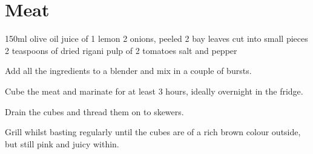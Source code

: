 \chapter{Meat}
\minitoc 


\begin{ingreds}
	150ml olive oil
	juice of 1 lemon
	2 onions, peeled
	2 bay leaves cut into small pieces
	2 teaspoons of dried rigani
	pulp of 2 tomatoes
	salt and pepper
\end{ingreds}

\begin{method}
     	Add all the ingredients to a blender and mix in a couple of bursts.

	Cube the meat and marinate for at least 3 hours, ideally overnight in the fridge.

	Drain the cubes and thread them on to skewers.

	Grill whilst basting regularly until the cubes are of a rich brown colour outside, but still pink and juicy within.
\end {method}